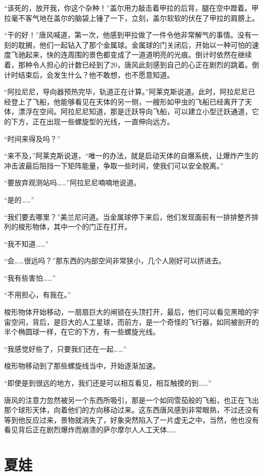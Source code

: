 “该死的，放开我，你这个杂种！”盖尔用力敲击着甲拉的后背，腿在空中蹬着。甲拉毫不客气地在盖尔的脑袋上锤了一下，立刻，盖尔软软的伏在了甲拉的肩膀上。

“干的好！”唐风喊道，第一次，他感到甲拉做了一件令他非常解气的事情。没有一刻的耽搁，他们一起钻入了那个金属球。金属球的门关闭后，开始以一种可怕的速度飞驰起来，快的连周围的景色都变成了一道道明亮的光痕。倒计时依然在继续着，那种令人担心的计数已经到了20，唐风此刻感到自己的心正在剧烈的跳着。倒计时结束后，会发生什么？他不敢想，也不愿意知道。

“阿拉尼尼，导向器预热完毕，轨道正在计算。”阿莱克斯说道。此时，阿拉尼尼已经登上了飞船，他能够看见在天体的另一侧，一艘形如甲虫的飞船已经离开了天体，漂浮在空间。阿拉尼尼知道，那是迁跃导向飞船，可以建立小型迁跃通道，它的下方，正在出现一些螺旋型的光线，一直伸向远方。

“时间来得及吗？”

“来不及，”阿莱克斯说道，“唯一的办法，就是启动天体的自爆系统，让爆炸产生的冲击波最后阻挡一下矩阵能量，争取一些时间，使我们可以安全脱离。”

“要放弃观测站吗……”阿拉尼尼喃喃地说道。

“是的……”

“我们要去哪里？”美兰尼问道。当金属球停下来后，他们发现面前有一排排整齐排列的梭形物体，其中一个的门正在打开。

“我不知道……”

“会……很远吗？”那东西的内部空间非常狭小，几个人刚好可以挤进去。

“我有些害怕……”

“不用担心，有我在。”

梭形物体开始移动，一扇扇巨大的闸锁在头顶打开，最后，他们可以看见黑暗的宇宙空间，背后，是巨大的人工星球，而前方，是一个奇怪的飞行器，如同被剖开的半个椭圆球一样，在它的下方，有一些螺旋光线。

“我感觉好些了，只要我们还在一起……”

梭形物移动到了那些螺旋线当中，开始逐渐加速。

“即使是到很远的地方，我们还是可以相互看见，相互触摸的到……”

唐风的注意力忽然被另一个东西所吸引，那是一个如同雪茄般的飞船，也正在飞出那个球形天体，向着他们的方向移动过来。这东西唐风感到非常眼熟，不过还没有等到他反应过来，景物就消失了，好象突然陷入了一片虚无之中，当然，他也没有看见背后正在剧烈爆炸而崩溃的萨尔摩尔人人工天体……

\chapter{夏娃}


